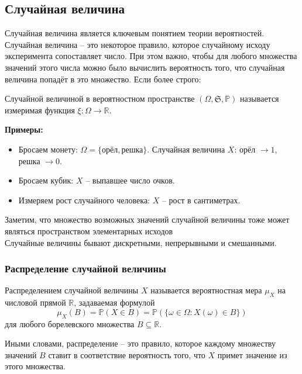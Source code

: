 \subsection{Случайная величина}

Случайная величина является ключевым понятием теории вероятностей.\\
Случайная величина -- это некоторое правило, которое случайному исходу эксперимента сопоставляет число. При этом важно, чтобы для любого множества значений этого числа можно было вычислить вероятность того, что случайная величина попадёт в это множество. Если более строго:

\begin{definition}
Случайной величиной в вероятностном пространстве $(\Omega, \mathfrak{S}, \mathbb{P})$ называется измеримая функция $\xi: \Omega \to \mathbb{R}$.
\end{definition}


\textbf{Примеры:}
\begin{itemize}
    \item Бросаем монету: $\Omega = \{\text{орёл}, \text{решка}\}$. Случайная величина $X$: орёл $\to 1$, решка $\to 0$.
    \item Бросаем кубик: $X$ -- выпавшее число очков.
    \item Измеряем рост случайного человека: $X$ -- рост в сантиметрах.
\end{itemize}

Заметим, что множество возможных значений случайной величины тоже
может являться пространством элементарных исходов\\

Случайные величины бывают дискретными, непрерывными и смешанными.

\subsubsection{Распределение случайной величины}

\begin{definition}
Распределением случайной величины $X$ называется вероятностная мера $\mu_X$ на числовой прямой $\mathbb{R}$, задаваемая формулой
\[
\mu_X(B) = \mathbb{P}(X \in B) = \mathbb{P}(\{\omega \in \Omega : X(\omega) \in B\})
\]
для любого борелевского множества $B \subseteq \mathbb{R}$.
\end{definition}

Иными словами, распределение -- это правило, которое каждому множеству значений $B$ ставит в соответствие вероятность того, что $X$ примет значение из этого множества.\\

